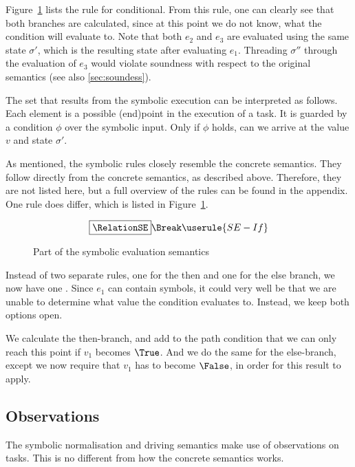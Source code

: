 Figure~\ref{fig:eval} lists the rule for conditional.
From this rule, one can clearly see that both branches are calculated, since at this point we do not know, what the condition will evaluate to.
Note that both $e_2$ and $e_3$ are evaluated using the same state $\sigma'$,
which is the resulting state after evaluating $e_1$.
Threading $\sigma''$ through the evaluation of $e_3$ would violate soundness with respect to the original semantics (see also \cref{sec:soundess}).

The set that results from the symbolic execution can be interpreted as follows.
Each element is a possible (end)point in the execution of a task.
It is guarded by a condition $\phi$ over the symbolic input.
Only if $\phi$ holds, can we arrive at the value $v$ and state $\sigma'$.

As mentioned, the symbolic rules closely resemble the concrete semantics.
They follow directly from the concrete semantics, as described above.
Therefore, they are not listed here, but a full overview of the rules can be found in the appendix.
One rule does differ, which is listed in Figure~\ref{fig:eval}.

\begin{figure}[h]
  \small
  \begin{gather*}
    \boxed{\RelationSE} \Break
    \userule{SE-If}
  \end{gather*}
  \caption{Part of the symbolic evaluation semantics}
  \label{fig:eval}
\end{figure}

Instead of two separate rules, one for the then and one for the else branch, we now have one .
Since $e_1$ can contain symbols, it could very well be that we are unable to determine what value the condition evaluates to.
Instead, we keep both options open.

We calculate the then-branch, and add to the path condition that we can only reach this point if $v_1$ becomes $\True$.
And we do the same for the else-branch, except we now require that $v_1$ has to become $\False$, in order for this result to apply.

\subsection{Observations}
\label{subsec:observations}
The symbolic normalisation and driving semantics make use of observations on tasks.
This is no different from how the concrete \TOPHAT semantics works.

